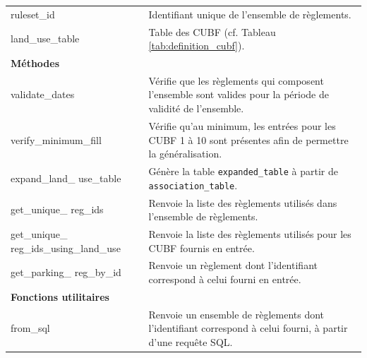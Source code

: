 {\begin{longtable}{p{5cm}p{11cm}}
                ruleset\_id & Identifiant unique de l'ensemble de règlements. \\
                land\_use\_table & Table des \ac{CUBF} (cf. Tableau \ref{tab:definition_cubf}). \\
                \midrule
                \multicolumn{2}{l}{\textbf{Méthodes}} \\
                \midrule
                validate\_dates & Vérifie que les règlements qui composent l'ensemble sont valides pour la période de validité de l'ensemble. \\
                verify\_minimum\_fill & Vérifie qu'au minimum, les entrées pour les \ac{CUBF} 1 à 10 sont présentes afin de permettre la généralisation. \\
                expand\_land\_ use\_table & Génère la table \texttt{expanded\_table} à partir de \texttt{association\_table}. \\
                get\_unique\_ reg\_ids & Renvoie la liste des règlements utilisés dans l'ensemble de règlements. \\
                get\_unique\_ reg\_ids\_using\_land\_use & Renvoie la liste des règlements utilisés pour les \ac{CUBF} fournis en entrée. \\
                get\_parking\_ reg\_by\_id & Renvoie un règlement dont l'identifiant correspond à celui fourni en entrée. \\
                \midrule
                \multicolumn{2}{l}{\textbf{Fonctions utilitaires}} \\
                \midrule
                from\_sql & Renvoie un ensemble de règlements dont l'identifiant correspond à celui fourni, à partir d'une requête SQL. \\
                
            \end{longtable}}
        \clearpage
